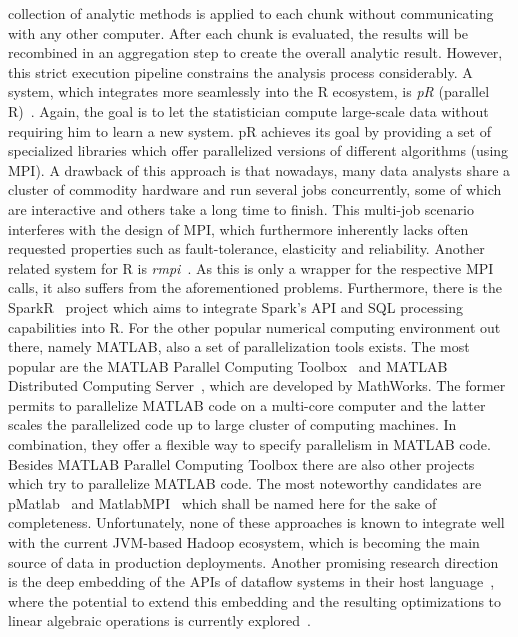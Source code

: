 collection of analytic methods is applied to each chunk without communicating with any other computer. After each chunk is evaluated, the results will be recombined in an aggregation step to create the overall analytic result. However, this strict execution pipeline constrains the analysis process considerably. A system, which integrates more seamlessly into the R ecosystem, is {\em pR} (parallel R)~\cite{samatova:2009a}. Again, the goal is to let the statistician compute large-scale data without requiring him to learn a new system. pR achieves its goal by providing a set of specialized libraries which offer parallelized versions of different algorithms (using MPI). A drawback of this approach is that nowadays, many data analysts share a cluster of commodity hardware and run several jobs concurrently, some of which are interactive and others take a long time to finish. This multi-job scenario interferes with the design of MPI, which furthermore inherently lacks often requested properties such as fault-tolerance, elasticity and reliability. Another related system for R is {\em rmpi}~\cite{rmpi}. As this is only a wrapper for the respective MPI calls, it also suffers from the aforementioned problems. Furthermore, there is the SparkR~\cite{Venkataraman2016} project which aims to integrate Spark's API and SQL processing capabilities into R. For the other popular numerical computing environment out there, namely MATLAB, also a set of parallelization tools exists. The most popular are the MATLAB Parallel Computing Toolbox~\cite{parallelComputingToolbox} and MATLAB Distributed Computing Server~\cite{distributedComputingServer}, which are developed by MathWorks. The former permits to parallelize MATLAB code on a multi-core computer and the latter scales the parallelized code up to large cluster of computing machines. In combination, they offer a flexible way to specify parallelism in MATLAB code. Besides MATLAB Parallel Computing Toolbox there are also other projects which try to parallelize MATLAB code. The most noteworthy candidates are pMatlab~\cite{bliss:ijhpca2007a} and MatlabMPI~\cite{kepner:jpdc2004a} which shall be named here for the sake of completeness. Unfortunately, none of these approaches is known to integrate well with the current JVM-based Hadoop ecosystem, which is becoming the main source of data in production deployments. Another promising research direction is the deep embedding of the APIs of dataflow systems in their host language~\cite{Alexandrov2015}, where the potential to extend this embedding and the resulting optimizations to linear algebraic operations is currently explored~\cite{Kunft2016}.